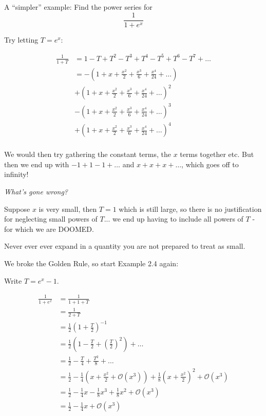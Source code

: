 \documentclass[10pt]{scrartcl}
\begin{document}
\begin{example} A ``simpler'' example: Find the power series for 
\[\frac{1}{1 + e^x}\]

Try letting $T = e^x$: 

\[
\begin{aligned}
  \frac{1}{1 + T} &= 1 - T + T^2 - T^3 + T^4 - T^5 + T^6 - T^7 + \dots\\
  &= -(1 + x + \frac{x^2}{2} + \frac{x^3}{6} + \frac{x^4}{24} + \dots)\\
  &+ (1 + x + \frac{x^2}{2} + \frac{x^3}{6} + \frac{x^4}{24} + \dots)^2\\
  &- (1 + x + \frac{x^2}{2} + \frac{x^3}{6} + \frac{x^4}{24} + \dots)^3\\
  &+ (1 + x + \frac{x^2}{2} + \frac{x^3}{6} + \frac{x^4}{24} + \dots)^4\\
\end{aligned}
\]

We would then try gathering the constant terms, the $x$ terms together etc. But then we end up with $-1 + 1 -1 + \dots$ and $x + x + x + \dots$, which goes off to infinity! 

\emph{What's gone wrong?}

 Suppose $x$ is very small, then $T = 1$ which is still large, so there is no justification for neglecting small powers of $T$... we end up having to include all powers of $T$ - for which we are DOOMED. 
 \end{example}

\begin{theorem}
	Never ever ever expand in a quantity you are not prepared to treat as small. 
\end{theorem}\vspace*{10pt}


\begin{example}
 We broke the Golden Rule, so start Example 2.4 again: 

Write $T = e^x - 1$.

\[
\begin{aligned}
  \frac{1}{1 +e^x} &= \frac{1}{1 + 1 + T}\\
  &= \frac{1}{2 + T}\\
  &= \frac{1}{2}\left(1 + \frac{T}{2}\right)^{-1}\\
  &= \frac{1}{2}\left( 1 -\frac{T}{2} + \left(\frac{T}{2}\right)^2\right) + \dots \\
  &= \frac{1}{2} - \frac{T}{4} + \frac{T^2}{8} + \dots\\
  &= \frac{1}{2} - \frac{1}{4}\left( x + \frac{x^2}{2} + \mathcal{O}(x^3)\right) + \frac{1}{8}\left(x + \frac{x^2}{2}\right)^2 + \mathcal{O}(x^3)\\
  &= \frac{1}{2} - \frac{1}{4}x - \frac{1}{8}x^3 + \frac{1}{8}x^2 + \mathcal{O}(x^3)\\
  &= \frac{1}{2} -\frac{1}{4}x + \mathcal{O}(x^3)
\end{aligned}
\]
 
 	
\end{example}
\end{document}
